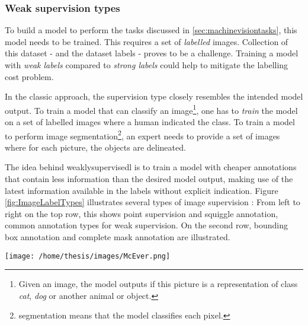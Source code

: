 \subsubsection{Weak supervision types\label{sec:weak_supervision}}
\par{
    To build a model to perform the tasks discussed in \ref{sec:machinevisiontasks}, this model needs to be trained.
    This requires a set of \textit{labelled} images.
    Collection of this dataset - and the dataset labels - proves to be a challenge. 
    Training a model with \textit{weak labels} compared to \textit{strong labels} could help to mitigate the labelling cost problem.
}
\par{
    In the classic approach, the supervision type closely resembles the intended model output.
    To train a model that can classify an image\footnote{Given an image, the model outputs if this picture is a representation of class \textit{cat}, \textit{dog} or another animal or object. }, 
    one has to \textit{train} the model on a set of labelled images where a human indicated the class.
    To train a model to perform image segmentation\footnote{segmentation means that the model classifies each pixel.}, an expert needs to provide a set of images where for each picture, the objects are delineated.  
}
\par{
    The idea behind \Gls{weaklysupervisedl} is to train a model with cheaper annotations that contain less information than the desired model output, 
    making use of the latest information available in the labels without explicit indication.
    Figure \ref{fig:ImageLabelTypes} illustrates several types of image supervision : 
    From left to right on the top row, this shows point supervision and squiggle annotation, common annotation types for weak supervision.
    On the second row, bounding box annotation and complete mask annotation are illustrated.
}

\begin{SCfigure}[][htb]
    \centering
    \texttt{[image: /home/thesis/images/McEver.png]}
    \caption{Four different annotation types \cite{McEver2020}: 
    On the top left the picture is point level annotated. The points are inflated for visibility.
    On the top right, squiggle annotation is used.
    The bottom left shows bounding box supervion.
    While the bottom right image is fully annotated.
    An image level label would indicate that there are multiple instances of \textit{person} and \textit{bike} in the image.
    \label{fig:ImageLabelTypes}}
\end{SCfigure}

